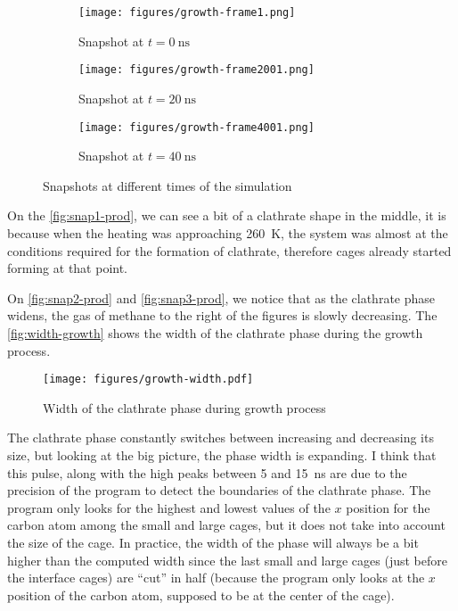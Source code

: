 \begin{figure}[htbp]
    \centering
    \begin{subfigure}[b]{1.\linewidth}
        \centering
        \texttt{[image: figures/growth-frame1.png]}
        \caption{Snapshot at $t = \SI{0}{\nano\second}$}
        \label{fig:snap1-prod}
    \end{subfigure}
    \begin{subfigure}[b]{1.\linewidth}
        \centering
        \texttt{[image: figures/growth-frame2001.png]}
        \caption{Snapshot at $t = \SI{20}{\nano\second}$}
        \label{fig:snap2-prod}
    \end{subfigure}
    \begin{subfigure}[b]{1.\linewidth}
        \centering
        \texttt{[image: figures/growth-frame4001.png]}
        \caption{Snapshot at $t = \SI{40}{\nano\second}$}
        \label{fig:snap3-prod}
    \end{subfigure}
    \caption{Snapshots at different times of the simulation}
    \label{fig:snaps-prod}
\end{figure}

On the \autoref{fig:snap1-prod}, we can see a bit of a clathrate shape in the middle, it is because when the heating was approaching \SI{260}{\kelvin}, the system was almost at the conditions required for the formation of clathrate, therefore cages already started forming at that point.

On \autoref{fig:snap2-prod} and \autoref{fig:snap3-prod}, we notice that as the clathrate phase widens, the gas of methane to the right of the figures is slowly decreasing. 
The \autoref{fig:width-growth} shows the width of the clathrate phase during the growth process.
\begin{figure}[htbp]
    \centering
    \texttt{[image: figures/growth-width.pdf]}
    \caption{Width of the clathrate phase during growth process}
    \label{fig:width-growth}
\end{figure}

The clathrate phase constantly switches between increasing and decreasing its size, but looking at the big picture, the phase width is expanding. I think that this pulse, along with the high peaks between 5 and \SI{15}{\nano\second} are due to the precision of the program to detect the boundaries of the clathrate phase. The program only looks for the highest and lowest values of the $x$ position for the carbon atom among the small and large cages, but it does not take into account the size of the cage. In practice, the width of the phase will always be a bit higher than the computed width since the last small and large cages (just before the interface cages) are ``cut'' in half (because the program only looks at the $x$ position of the carbon atom, supposed to be at the center of the cage).

